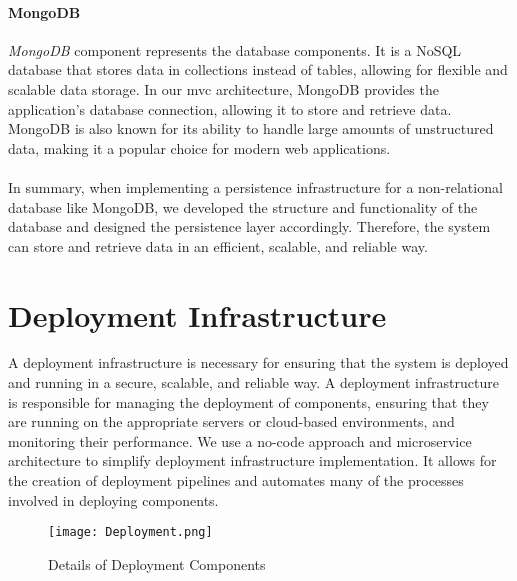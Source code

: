 \clearpage
\paragraph{MongoDB}
\textit{MongoDB} component represents the database components.
It is a NoSQL database that stores data in collections instead of tables, allowing for flexible and scalable data storage. 
In our \ac{mvc} architecture, MongoDB provides the application's database connection, allowing it to store and retrieve data. 
MongoDB is also known for its ability to handle large amounts of unstructured data, making it a popular choice for modern web applications.\\\\
In summary, when implementing a persistence infrastructure for a non-relational database like MongoDB, we developed the structure and functionality of the database and designed the persistence layer accordingly. 
Therefore, the system can store and retrieve data in an efficient, scalable, and reliable way.


\clearpage
\section{Deployment Infrastructure}
\label{sc:section:deployment}
A deployment infrastructure is necessary for ensuring that the system is deployed and running in a secure, scalable, and reliable way. 
A deployment infrastructure is responsible for managing the deployment of components, ensuring that they are running on the appropriate servers or cloud-based environments, and monitoring their performance.
We use a no-code approach and microservice architecture to simplify deployment infrastructure implementation. 
It allows for the creation of deployment pipelines and automates many of the processes involved in deploying components.

\begin{figure}[htbp!]
    \centering    
    \texttt{[image: Deployment.png]} 
    \caption[Details of Deployment Components]{Details of Deployment Components}
    \label{fig:sc:deployment}
\end{figure}

